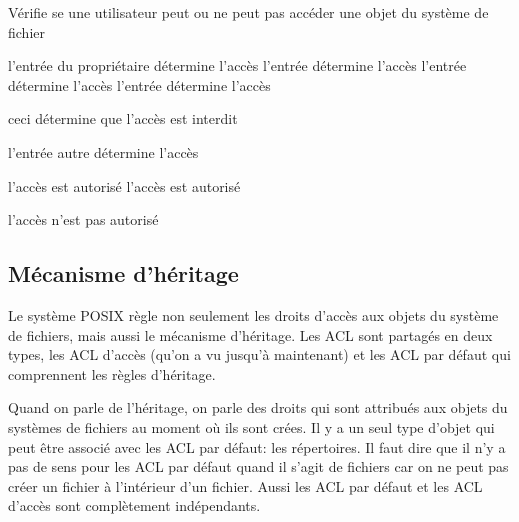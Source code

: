 \documentclass{article}
\begin{document}
\begin{algorithm}
\caption{Vérifie se une utilisateur peut ou ne peut pas accéder une objet du système de fichier}
\label{algacl}
\begin{algorithmic}
\STATE l'entrée du propriétaire détermine l'accès
\STATE l'entrée détermine l'accès
\STATE l'entrée détermine l'accès
\STATE l'entrée détermine l'accès
 
\STATE ceci détermine que l'accès est interdit
 
\ELSE
\STATE l'entrée autre détermine l'accès
\ENDIF
 
%
\STATE 
l'accès est autorisé
\STATE l'accès est autorisé
 
\ELSE
\STATE l'accès n'est pas autorisé
\ENDIF
\end{algorithmic}
\end{algorithm}

 
\subsection{Mécanisme d'héritage}
\label{sec:heritage}
 
Le système POSIX règle non seulement les droits d'accès aux objets du système de fichiers, mais aussi le mécanisme d'héritage. Les ACL sont partagés en deux types, les 
ACL d'accès (qu'on a vu jusqu'à maintenant) et les ACL par défaut qui comprennent les règles d'héritage.
 
Quand on parle de l'héritage, on parle des droits qui sont attribués aux objets du systèmes de fichiers au moment où ils sont crées. Il y a un seul type d'objet qui peut être associé avec les ACL par défaut: les répertoires. Il faut dire que il n'y a pas de sens pour les ACL par défaut quand il s'agit de fichiers car on ne peut pas créer un fichier à l'intérieur d'un fichier. Aussi les ACL par défaut et les 
ACL d'accès sont complètement indépendants.
 
\end{document}
